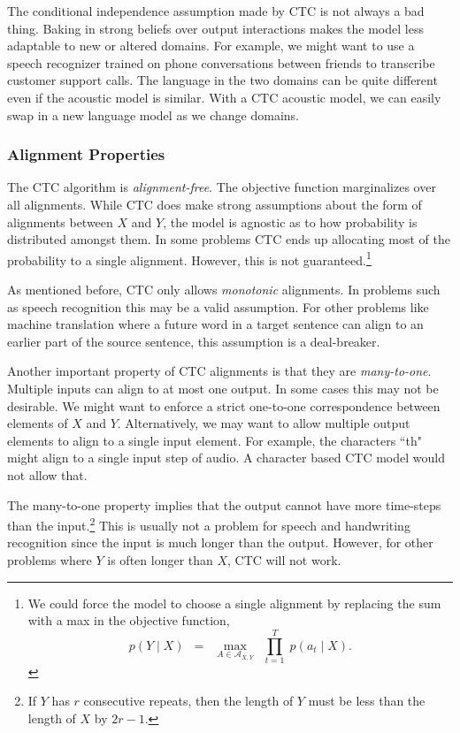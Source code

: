 The conditional independence assumption made by CTC is not always a bad thing.
Baking in strong beliefs over output interactions makes the model less
adaptable to new or altered domains. For example, we might want to use a speech
recognizer trained on phone conversations between friends to transcribe
customer support calls. The language in the two domains can be quite different
even if the acoustic model is similar. With a CTC acoustic model, we can easily
swap in a new language model as we change domains.

\subsubsection{Alignment Properties}

The CTC algorithm is {\it alignment-free}. The objective function marginalizes
over all alignments. While CTC does make strong assumptions about the form of
alignments between $X$ and $Y$, the model is agnostic as to how probability is
distributed amongst them. In some problems CTC ends up allocating most of the
probability to a single alignment. However, this is not guaranteed.\footnote{We
could force the model to choose a single alignment by replacing the sum with a
max in the objective function,
\[
p(Y \mid X) \enspace = \enspace \max_{A \in \mathcal{A}_{X,Y}} \enspace \prod_{t=1}^T \; p(a_t \mid X).
\]
}

As mentioned before, CTC only allows {\it monotonic} alignments. In problems
such as speech recognition this may be a valid assumption. For other problems
like machine translation where a future word in a target sentence can align to
an earlier part of the source sentence, this assumption is a deal-breaker.

Another important property of CTC alignments is that they are {\it
many-to-one}. Multiple inputs can align to at most one output. In some cases
this may not be desirable. We might want to enforce a strict one-to-one
correspondence between elements of $X$ and $Y$. Alternatively, we may want to
allow multiple output elements to align to a single input element. For example,
the characters ``th" might align to a single input step of audio. A character
based CTC model would not allow that.

The many-to-one property implies that the output cannot have more time-steps
than the input.\footnote{If $Y$ has $r$ consecutive repeats, then the length of
$Y$ must be less than the length of $X$ by $2r - 1$.} This is usually not a
problem for speech and handwriting recognition since the input is much longer
than the output. However, for other problems where $Y$ is often longer than
$X$, CTC will not work.

